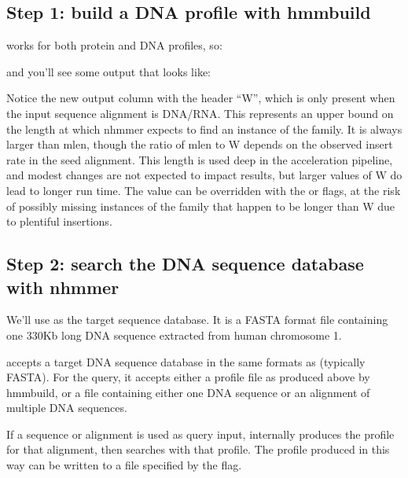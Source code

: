 \subsection{Step 1: build a DNA profile with hmmbuild}

 works for both protein and DNA profiles, so:

   \vspace{1ex}
   \vspace{1ex}

and you'll see some output that looks like:



Notice the new output column with the header ``W'', which is only
present when the input sequence alignment is DNA/RNA. This represents
an upper bound on the length at which nhmmer expects to find an
instance of the family.  It is always larger than mlen,
though the ratio of mlen to W depends on the observed insert rate in
the seed alignment. This length is used deep in the acceleration
pipeline, and modest changes are not expected to impact results, but
larger values of W do lead to longer run time. The value can be
overridden with the  or  flags, at
the risk of possibly missing instances of the family that happen to be
longer than W due to plentiful insertions.



\subsection{Step 2: search the DNA sequence database with nhmmer}

We'll use  as the target sequence
database. It is a FASTA format file containing one 330Kb long DNA
sequence extracted from human chromosome 1.

 accepts a target DNA sequence database in the same
formats as  (typically FASTA). For the query, it accepts
either a profile file as produced above by hmmbuild, or a file
containing either one DNA sequence or an alignment of multiple DNA
sequences.


If a sequence or alignment is used as query input, 
internally produces the profile for that alignment, then searches with that
profile. The profile produced in this way can be written to a file
specified by the  flag.

